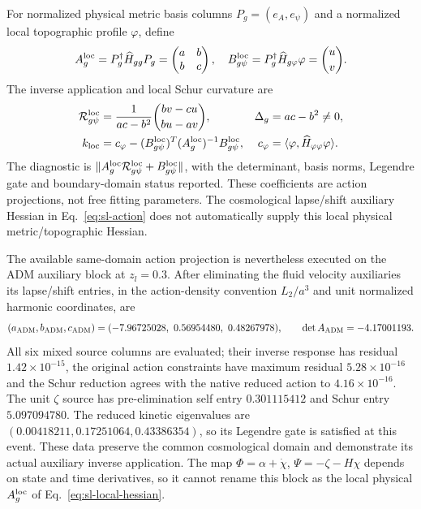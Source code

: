 For normalized physical metric basis columns $P_g=(e_A,e_\psi)$ and a
normalized local topographic profile $\varphi$, define
\begin{equation}
 A_g^{\rm loc}=P_g^\dagger\widehat H_{gg}P_g=
 \begin{pmatrix}a&b\\b&c\end{pmatrix},
 \quad B_{g\psi}^{\rm loc}=P_g^\dagger\widehat H_{g\varphi}\varphi
 =\binom uv.
 \label{eq:sl-local-hessian}
\end{equation}
The inverse application and local Schur curvature are
\begin{align}
 \mathcal R_{g\psi}^{\rm loc}
 &=\frac{1}{ac-b^2}\binom{bv-cu}{bu-av},
 &\Delta_g&=ac-b^2\ne0,\label{eq:sl-local-response}\\
 k_{\rm loc}&=c_\varphi-(B_{g\psi}^{\rm loc})^T
 (A_g^{\rm loc})^{-1}B_{g\psi}^{\rm loc},
 &c_\varphi&=\langle\varphi,\widehat H_{\varphi\varphi}\varphi\rangle.
 \nonumber
\end{align}
The diagnostic is
$\|A_g^{\rm loc}\mathcal R_{g\psi}^{\rm loc}+B_{g\psi}^{\rm loc}\|$,
with the determinant, basis norms, Legendre gate and boundary-domain status
reported. These coefficients are action projections, not free fitting
parameters. The cosmological lapse/shift auxiliary Hessian in
Eq.~\eqref{eq:sl-action} does not automatically supply this local physical
metric/topographic Hessian.

The available same-domain action projection is nevertheless executed on
the ADM auxiliary block at $z_l=0.3$. After eliminating the fluid velocity
auxiliaries its lapse/shift entries, in the action-density convention
$L_2/a^3$ and unit normalized harmonic coordinates, are
\begin{equation}
 (a_{\rm ADM},b_{\rm ADM},c_{\rm ADM})
 =(-7.96725028,\ 0.56954480,\ 0.48267978),
 \qquad \det A_{\rm ADM}=-4.17001193.
\end{equation}
All six mixed source columns are evaluated; their inverse response has
residual $1.42\times10^{-15}$, the original action constraints have maximum
residual $5.28\times10^{-16}$ and the Schur reduction agrees with the native
reduced action to $4.16\times10^{-16}$. The unit $\zeta$ source has
pre-elimination self entry $0.301115412$ and Schur entry $5.097094780$.
The reduced kinetic eigenvalues are $(0.00418211,0.17251064,0.43386354)$,
so its Legendre gate is satisfied at this event. These data preserve the
common cosmological domain and demonstrate its actual auxiliary inverse
application. The map
$\Phi=\alpha+\dot\chi$, $\Psi=-\zeta-H\chi$ depends on state and time
derivatives, so it cannot rename this block as the local physical
$A_g^{\rm loc}$ of Eq.~\eqref{eq:sl-local-hessian}.

